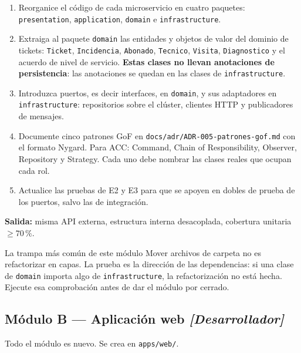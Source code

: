 \documentclass[11pt,a4paper]{article}
\begin{document}
\begin{enumerate}[leftmargin=*,itemsep=3pt]
	\item Reorganice el código de cada microservicio en cuatro paquetes: \texttt{presentation}, \texttt{application}, \texttt{domain} e \texttt{infrastructure}.
	\item Extraiga al paquete \texttt{domain} las entidades y objetos de valor del dominio de tickets: \texttt{Ticket}, \texttt{Incidencia}, \texttt{Abonado}, \texttt{Tecnico}, \texttt{Visita}, \texttt{Diagnostico} y el acuerdo de nivel de servicio. \textbf{Estas clases no llevan anotaciones de persistencia}: las anotaciones se quedan en las clases de \texttt{infrastructure}.
	\item Introduzca puertos, es decir interfaces, en \texttt{domain}, y sus adaptadores en \texttt{infrastructure}: repositorios sobre el clúster, clientes HTTP y publicadores de mensajes.
	\item Documente cinco patrones GoF en \texttt{docs/adr/ADR-005-\allowbreak patrones-gof.md} con el formato Nygard. Para ACC: Command, Chain of Responsibility, Observer, Repository y Strategy. Cada uno debe nombrar las clases reales que ocupan cada rol.
	\item Actualice las pruebas de E2 y E3 para que se apoyen en dobles de prueba de los puertos, salvo las de integración.
\end{enumerate}

\textbf{Salida:} misma API externa, estructura interna desacoplada, cobertura unitaria $\geq 70\,\%$.

\begin{avisoBox}{La trampa más común de este módulo}
	Mover archivos de carpeta no es refactorizar en capas. La prueba es la dirección de las dependencias: si una clase de \texttt{domain} importa algo de \texttt{infrastructure}, la refactorización no está hecha. Ejecute esa comprobación antes de dar el módulo por cerrado.
\end{avisoBox}

\subsection{Módulo B --- Aplicación web \emph{[Desarrollador]}}

Todo el módulo es nuevo. Se crea en \texttt{apps/web/}.
\end{document}
